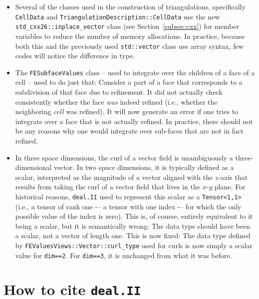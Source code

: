 \documentclass{ansarticle-preprint}
\newcommand{\specialword}[1]{\texttt{#1}}
\newcommand{\dealii}{{\specialword{deal.II}}\xspace}
\begin{document}
\begin{itemize}
\item Several of the classes used in the construction of
  triangulations, specifically \texttt{CellData} and
  \texttt{TriangulationDescription::CellData} use the new
  \texttt{std\_cxx26::inplace\_vector} class (see
  Section~\ref{subsec:cxx}) for member variables to reduce the number
  of memory allocations. In practice, because both this and the
  previously used \texttt{std::vector} class use array syntax, few
  codes will notice the difference in type.
\item The \texttt{FESubfaceValues} class -- used to integrate over the
  children of a face of a cell -- used to do just that: Consider a
  part of a face that corresponds to a subdivision of that face due to
  refinement. It did not actually check consistently whether the face
  \textit{was} indeed refined (i.e., whether the neighboring \textit{cell} was refined). It
  will now generate an error if one tries to integrate over a face
  that is not actually refined. In practice, there should not be any
  reasons why one would integrate over sub-faces that are not in fact
  refined.
\item  In three space dimensions, the curl of a vector field is
  unambiguously a three-dimensional vector. In two space dimensions,
  it is typically defined as a scalar, interpreted as the magnitude of
  a vector aligned with the $z$-axis that results from taking the curl
  of a vector field that lives in the $x$-$y$ plane. For historical
  reasons, \dealii{} used to represent this scalar as a
  \texttt{Tensor<1,1>} (i.e., a tensor of rank one -– a tensor with
  one index -– for which the only possible value of the index is
  zero). This is, of course, entirely equivalent to it being a scalar,
  but it is semantically wrong: The data type should have been a
  scalar, not a vector of length one. This is now fixed: The data type defined by \texttt{FEValuesViews::Vector::curl\_type} used for curls is now simply a scalar value for \texttt{dim==2}. For \texttt{dim==3}, it is unchanged from what it was before.
\end{itemize}



\section{How to cite \dealii}
\label{sec:cite}
\end{document}
